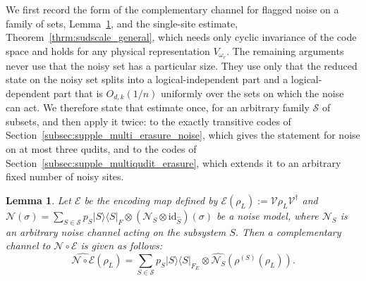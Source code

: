 \documentclass[10pt,twocolumn,superscriptaddress,aps,amsmath,amssymb,citeautoscript,floatfix,prx]{revtex4-2}
\theoremstyle{plain}
\theoremstyle{plain}
\theoremstyle{plain}
\theoremstyle{plain}
\theoremstyle{plain}
\theoremstyle{plain}
\theoremstyle{plain}
\newtheorem{smlemma}[smtheorem]{Lemma}
\theoremstyle{definition}
\theoremstyle{plain}
\begin{document}
\begin{appendix}
We first record the form of the complementary channel for flagged noise on a family of sets, Lemma~\ref{lem:dual_to_arb}, and the single-site estimate, Theorem~\ref{thrm:sudscale_general}, 
which needs only cyclic invariance of the code space and holds for any physical representation $V_{\omega_r}$. 
The remaining arguments never use that the noisy set has a particular size. 
They use only that the reduced state on the noisy set splits into a logical-independent part and a logical-dependent part that is $O_{d,k}(1/n)$ 
uniformly over the sets on which the noise can act. We therefore state that estimate once, for an arbitrary family $\mathcal S$ of subsets, 
and then apply it twice: to the exactly transitive codes of Section~\ref{subsec:supple_multi_erasure_noise}, which gives the statement for noise on at most three qudits, and to the codes of 
Section~\ref{subsec:supple_multiqudit_erasure}, which extends it to an arbitrary fixed number of noisy sites.

\begin{smlemma}\label{lem:dual_to_arb}
    Let $\mathcal{E}$ be the encoding map defined by $\mathcal{E}(\rho_L):=\mathcal{V}\rho_L \mathcal{V}^{\dagger}$ and
    $
        \mathcal N(\sigma)
        =
        \sum_{S\in\mathcal S}
        p_S
        |S\rangle\langle S|_F
        \otimes
        \left(\mathcal N_S\otimes \mathrm{id}_{\hat S}\right)(\sigma)
    $
    be a noise model, where $\mathcal{N}_S$ is an arbitrary noise channel acting on the subsystem $S$. 
    Then a complementary channel to $\mathcal{N}\circ \mathcal{E}$ is given as follows:
    \[
        \widehat{\mathcal{N} \circ \mathcal{E}}\left(\rho_L\right)
        =
        \sum_{S\in\mathcal S}
        p_S
        |S\rangle\langle S|_{F_E}
        \otimes
        \widehat{\mathcal{N}_S}\left(\rho^{(S)}\left(\rho_L\right)\right).
    \]
\end{smlemma}


\end{appendix}
\end{document}
